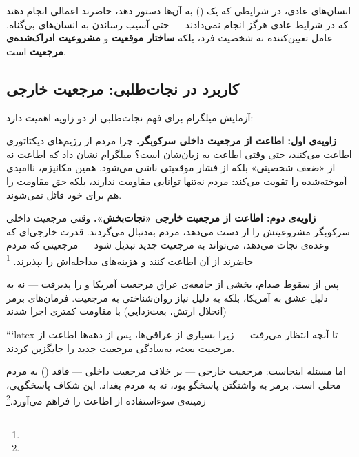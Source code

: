 \begin{tcolorbox}[defbox, title={یافته‌ی کلیدی آزمایش میلگرام}]
انسان‌های عادی، در شرایطی که یک  () به آن‌ها دستور دهد، حاضرند اعمالی انجام دهند که در شرایط عادی هرگز انجام نمی‌دادند — حتی آسیب رساندن به انسان‌های بی‌گناه. عامل تعیین‌کننده نه شخصیت فرد، بلکه \textbf{ساختار موقعیت} و \textbf{مشروعیت ادراک‌شده‌ی مرجعیت} است.
\end{tcolorbox}

\subsection{کاربرد در نجات‌طلبی: مرجعیت خارجی}
\label{subsec:ch11-milgram-application}

آزمایش میلگرام برای فهم نجات‌طلبی از دو زاویه اهمیت دارد:

\textbf{زاویه‌ی اول: اطاعت از مرجعیت داخلی سرکوبگر.}
چرا مردم از رژیم‌های دیکتاتوری اطاعت می‌کنند، حتی وقتی اطاعت به زیان‌شان است؟ میلگرام نشان داد که اطاعت نه از «ضعف شخصیتی» بلکه از فشار موقعیتی ناشی می‌شود. همین مکانیزم، ناامیدی آموخته‌شده را تقویت می‌کند: مردم نه‌تنها توانایی مقاومت ندارند، بلکه \textit{حق} مقاومت را هم برای خود قائل نمی‌شوند.

\textbf{زاویه‌ی دوم: اطاعت از مرجعیت خارجی «نجات‌بخش».}
وقتی مرجعیت داخلی سرکوبگر مشروعیتش را از دست می‌دهد، مردم به‌دنبال  می‌گردند. قدرت خارجی‌ای که وعده‌ی نجات می‌دهد، می‌تواند به مرجعیت جدید تبدیل شود — مرجعیتی که مردم حاضرند از آن اطاعت کنند و هزینه‌های مداخله‌اش را بپذیرند. \footnote{}

\begin{tcolorbox}[casebox, title={مطالعه‌ی موردی: اطاعت از مرجعیت در عراق ۲۰۰۳}]
پس از سقوط صدام، بخشی از جامعه‌ی عراق مرجعیت آمریکا و  را پذیرفت — نه به دلیل عشق به آمریکا، بلکه به دلیل نیاز روان‌شناختی به مرجعیت. فرمان‌های برمر (انحلال ارتش، بعث‌زدایی) با مقاومت کمتری اجرا شدند

```latex
تا آنچه انتظار می‌رفت — زیرا بسیاری از عراقی‌ها، پس از دهه‌ها اطاعت از مرجعیت بعث، به‌سادگی مرجعیت جدید را جایگزین کردند.

اما مسئله اینجاست: مرجعیت خارجی — بر خلاف مرجعیت داخلی — فاقد  () به مردم محلی است. برمر به واشنگتن پاسخگو بود، نه به مردم بغداد. این شکاف پاسخگویی، زمینه‌ی سوءاستفاده از اطاعت را فراهم می‌آورد.\footnote{}
\end{tcolorbox}


